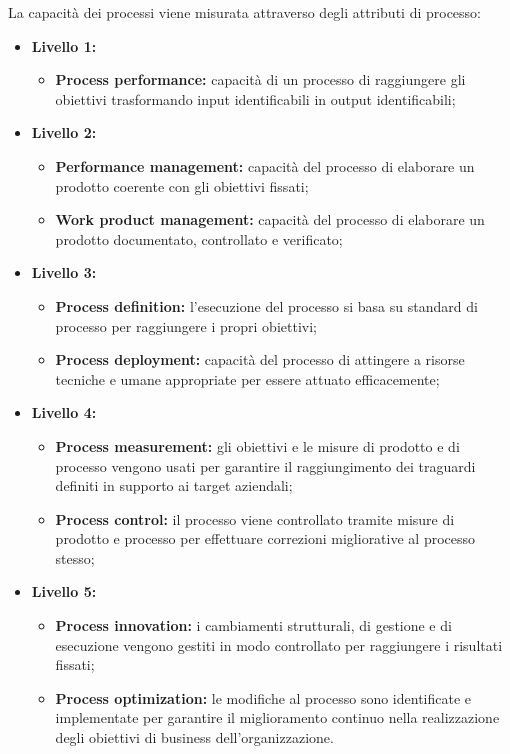 \documentclass[NormeDiProgetto.tex]{subfiles}
\begin{document}
La capacità dei processi viene misurata attraverso degli attributi di processo:
\begin{itemize}
	\item \textbf{Livello 1:}
	\begin{itemize}
		\item \textbf{Process performance:} capacità di un processo di raggiungere gli obiettivi trasformando input identificabili in output identificabili;
	\end{itemize}
	\item \textbf{Livello 2:}
	\begin{itemize}
		\item \textbf{Performance management:} capacità del processo di elaborare un prodotto coerente con gli obiettivi fissati;
		\item \textbf{Work product management:} capacità del processo di elaborare un prodotto documentato, controllato e verificato;
	\end{itemize}
	\item \textbf{Livello 3:}
	\begin{itemize}
		\item \textbf{Process definition:} l'esecuzione del processo si basa su standard di processo per raggiungere i propri obiettivi;
		\item \textbf{Process deployment:} capacità del processo di attingere a risorse tecniche e umane appropriate per essere attuato efficacemente;
	\end{itemize}
	\item \textbf{Livello 4:}
	\begin{itemize}
		\item \textbf{Process measurement:} gli obiettivi e le misure di prodotto e di processo vengono usati per garantire il raggiungimento dei traguardi definiti in supporto ai target aziendali;
		\item \textbf{Process control:} il processo viene controllato tramite misure di prodotto e processo per effettuare correzioni migliorative al processo stesso;
	\end{itemize}
	\item \textbf{Livello 5:}
	\begin{itemize}
		\item \textbf{Process innovation:} i cambiamenti strutturali, di gestione e di esecuzione vengono gestiti in modo controllato per raggiungere i risultati fissati;
		\item \textbf{Process optimization:} le modifiche al processo sono identificate e implementate per garantire il miglioramento continuo nella realizzazione degli obiettivi di business dell'organizzazione. 
	\end{itemize}
\end{itemize}
\end{document}
